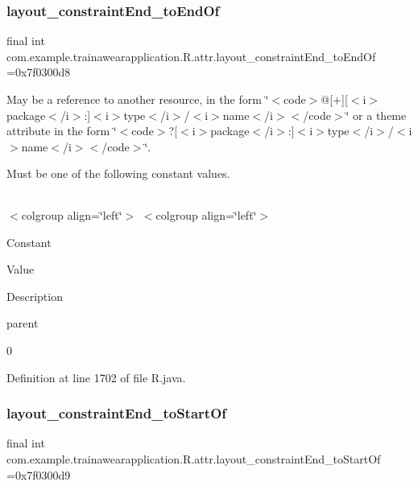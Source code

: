 \subsubsection{\texorpdfstring{layout\_constraintEnd\_toEndOf}{layout\_constraintEnd\_toEndOf}}
{\footnotesize\ttfamily final int com.\+example.\+trainawearapplication.\+R.\+attr.\+layout\+\_\+constraint\+End\+\_\+to\+End\+Of =0x7f0300d8\hspace{0.3cm}{\ttfamily [static]}}

May be a reference to another resource, in the form \char`\"{}$<$code$>$@\mbox{[}+\mbox{]}\mbox{[}$<$i$>$package$<$/i$>$\+:\mbox{]}$<$i$>$type$<$/i$>$/$<$i$>$name$<$/i$>$$<$/code$>$\char`\"{} or a theme attribute in the form \char`\"{}$<$code$>$?\mbox{[}$<$i$>$package$<$/i$>$\+:\mbox{]}$<$i$>$type$<$/i$>$/$<$i$>$name$<$/i$>$$<$/code$>$\char`\"{}. 

Must be one of the following constant values.

\tabulinesep=1mm
\begin{longtabu}spread 0pt [c]{*{0}{|X[-1]}|}
\hline
\end{longtabu}
$<$colgroup align=\char`\"{}left\char`\"{}$>$ $<$colgroup align=\char`\"{}left\char`\"{}$>$ 

Constant

Value

Description 

parent

0

Definition at line 1702 of file R.\+java.

\mbox{\label{classcom_1_1example_1_1trainawearapplication_1_1_r_1_1attr_abd8a857255a342b93f6fd3c6347f6607}} 
\subsubsection{\texorpdfstring{layout\_constraintEnd\_toStartOf}{layout\_constraintEnd\_toStartOf}}
{\footnotesize\ttfamily final int com.\+example.\+trainawearapplication.\+R.\+attr.\+layout\+\_\+constraint\+End\+\_\+to\+Start\+Of =0x7f0300d9\hspace{0.3cm}{\ttfamily [static]}}

